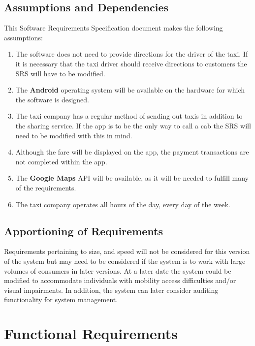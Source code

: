 \documentclass[english]{article}
\begin{document}
\subsection{Assumptions and Dependencies}
\label{sub:assumptions_and_dependencies}
This Software Requirements Specification document makes the following assumptions:
\begin{enumerate}
	\item The software does not need to provide directions for the driver of the taxi. If it is necessary that the taxi driver should receive directions to customers the SRS will have to be modified.
	\item The  \textbf{Android} operating system will be available on the hardware for which the software is designed.
	\item The taxi company has a regular method of sending out taxis in addition to the sharing service. If the app is to be the only way to call a cab the SRS will need to be modified with this in mind.
	\item Although the fare will be displayed on the app, the payment transactions are not completed within the app. 
	\item The \textbf{Google Maps} API will be available, as it will be needed to fulfill many of the requirements.
	\item The taxi company operates all hours of the day, every day of the week.
\end{enumerate}

\subsection{Apportioning of Requirements}
\label{sub:apportioning_of_requirements}
Requirements pertaining to size, and speed will not be considered for this version of the system but may need to be considered if the system is to work with large volumes of consumers in later versions. At a later date the system could be modified to accommodate individuals with mobility access difficulties and/or visual impairments. In addition, the system can later consider auditing functionality for system management. 


\section{Functional Requirements}
\label{sec:functional_requirements}
\end{document}
